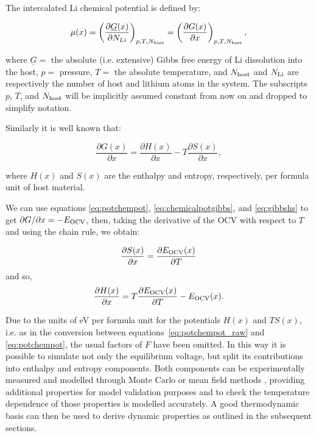 \documentclass[../main.tex]{subfiles}
\begin{document}
The intercalated Li chemical potential is defined by:

\begin{equation}
    \mu(x) = \left(\frac{\partial{\underline{G}(x)}}{\partial{N_{Li}}}\right)_{p,T,N_{\rm{host}}} = \left(\frac{\partial{G(x)}}{\partial{x}}\right)_{p,T,N_{\rm{host}}},
    \label{eq:chemicalpotgibbs}
\end{equation}

where $\underline{G} =$ the absolute (i.e. extensive) Gibbs free energy of Li dissolution into the host, $p =$ pressure, $T =$ the absolute temperature, and $N_{\rm{host}}$ and $N_{\rm{Li}}$ are respectively the number of host and lithium atoms in the system. The subscripts $p$, $T$, and $N_{\rm{host}}$ will be implicitly assumed constant from now on and dropped to simplify notation.

Similarly it is well known that:

\begin{equation}
    \frac{\partial{G(x)}}{\partial{x}} = \frac{\partial{H(x)}}{\partial{x}} - T\frac{\partial{S(x)}}{\partial{x}}, 
    \label{eq:gibbshs}
\end{equation}

where $H(x)$ and $S(x)$ are the enthalpy and entropy, respectively, per formula unit of host material.

We can use equations \ref{eq:potchempot}, \ref{eq:chemicalpotgibbs}, and \ref{eq:gibbshs} to get $\partial{G}/\partial{x} = -E_{\rm{OCV}}$, then, taking the derivative of the OCV with respect to $T$ and using the chain rule, we obtain:

\begin{equation}
   \frac{\partial{S(x)}}{\partial{x}} = \frac{\partial{E_{\rm{OCV}}(x)}}{\partial{T}}
    \label{eq:entropy_measurement}
\end{equation}
and so,
\begin{equation}
    \frac{\partial{H(x)}}{\partial{x}} = T\frac{\partial{E_{\rm{OCV}}(x)}}{\partial{T}} - E_{\rm{OCV}}(x).
    \label{eq:enthalpy_measurement}
\end{equation}

Due to the units of eV per formula unit for the potentials $H(x)$ and $TS(x)$, i.e. as in the conversion between equations~\ref{eq:potchempot_raw} and \ref{eq:potchempot}, the usual factors of $F$ have been omitted. In this way it is possible to simulate not only the equilibrium voltage, but split its contributions into enthalpy and entropy components. Both components can be experimentally measured \cite{schlueter_quantifying_2018,Mercer2019,THOMAS2003844,Reynier2004,Yazami_2006} and modelled through Monte Carlo or mean field methods \cite{schlueter_quantifying_2018,mercer_influence_2017,Mercer2019,Leiva2017b}, providing additional properties for model validation purposes and to check the temperature dependence of those properties is modelled accurately. A good thermodynamic basis can then be used to derive dynamic properties as outlined in the subsequent sections.
\end{document}
